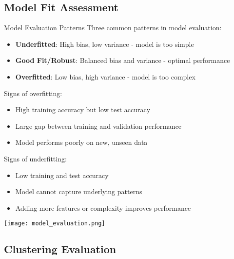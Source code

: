 \subsection{Model Fit Assessment}

\begin{concept}{Model Evaluation Patterns}
Three common patterns in model evaluation:
\begin{itemize}
    \item \textbf{Underfitted}: High bias, low variance - model is too simple
    \item \textbf{Good Fit/Robust}: Balanced bias and variance - optimal performance
    \item \textbf{Overfitted}: Low bias, high variance - model is too complex
\end{itemize}

Signs of overfitting:
\begin{itemize}
    \item High training accuracy but low test accuracy
    \item Large gap between training and validation performance
    \item Model performs poorly on new, unseen data
\end{itemize}

Signs of underfitting:
\begin{itemize}
    \item Low training and test accuracy
    \item Model cannot capture underlying patterns
    \item Adding more features or complexity improves performance
\end{itemize}
\end{concept}

\texttt{[image: model\_evaluation.png]}
\subsection{Clustering Evaluation}

